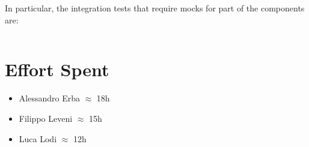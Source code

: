 \documentclass[english]{article}
\begin{document}
In particular, the integration tests that require mocks for part of the components are:
\begin{tabular}{l|p{7cm}}
 
\end{tabular}

\clearpage
\section{Effort Spent} %
	\begin{itemize}
		\item Alessandro Erba $\approx$ 18h
		\item Filippo Leveni 	$\approx$ 15h
		\item Luca Lodi $\approx$ 12h
	\end{itemize}
\end{document}
